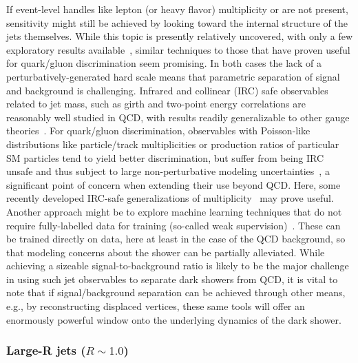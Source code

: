 If event-level handles like lepton (or heavy flavor) multiplicity or \MET are not present, sensitivity might still be achieved by looking toward the internal structure of the jets themselves. While this topic is presently relatively uncovered, with only a few exploratory results available~\cite{Park:2017rfb}, similar techniques to those that have proven useful for quark/gluon discrimination seem promising. In both cases the lack of a perturbatively-generated hard scale means that parametric separation of signal and background is challenging. Infrared and collinear (IRC) safe observables related to jet mass, such as girth and two-point energy correlations are reasonably well studied in QCD, with results readily generalizable to other gauge theories~\cite{Gallicchio:2010dq,Larkoski:2013eya,Larkoski:2014gra}. For quark/gluon discrimination, observables with Poisson-like distributions like particle/track multiplicities or production ratios of particular SM particles tend to yield better discrimination, but suffer from being IRC unsafe and thus subject to large non-perturbative modeling uncertainties~\cite{Gras:2017jty}, a significant point of concern when extending their use beyond QCD. Here, some recently developed IRC-safe generalizations of multiplicity~\cite{Frye:2017yrw} may prove useful.  Another approach might be to explore machine learning techniques that do not require fully-labelled data for training (so-called weak supervision)~\cite{Dery:2017fap,Cohen:2017exh,Metodiev:2017vrx}.  These can be trained directly on data, here at least in the case of the QCD background, so that modeling concerns about the shower can be partially alleviated.  While achieving a sizeable signal-to-background ratio is likely to be the major challenge in using such jet observables to separate dark showers from QCD, it is vital to note that if signal/background separation can be achieved through other means, e.g., by reconstructing displaced vertices, these same tools will offer an enormously powerful window onto the underlying dynamics of the dark shower.



\subsubsection{Large-R jets ($R \sim 1.0$)}
\label{sec:darkshowerfatjet}


